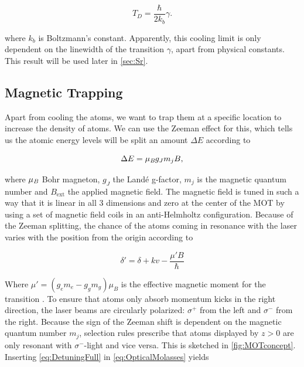 \begin{equation}\label{eq:DopplerTemperature}
	T_D = \frac{\hbar}{2k_b} \gamma.
\end{equation}

where $k_b$ is Boltzmann's constant. Apparently, this cooling limit is only dependent on the linewidth of the transition $\gamma$, apart from physical constants. This result will be used later in \cref{sec:Sr}.

\subsection{Magnetic Trapping}

Apart from cooling the atoms, we want to trap them at a specific location to increase the density of atoms. 
We can use the Zeeman effect for this, which tells us the atomic energy levels will be split an amount $\Delta E$ according to \cite{Griffiths2004}

\begin{equation}\label{eq:Zeeman}
	\Delta E = \mu_{\emph{B}} g_J m_j B,
\end{equation}

where $\mu_{\emph{B}}$ Bohr magneton, $g_J$ the Landé g-factor, $m_j$ is the magnetic quantum number and $B_{\text{ext}}$ the applied magnetic field. 
The magnetic field is tuned in such a way that it is linear in all 3 dimensions and zero at the center of the \ac{MOT} by using a set of magnetic field coils in an anti-Helmholtz configuration. 
Because of the Zeeman splitting, the chance of the atoms coming in resonance with the laser varies with the position from the origin according to \cite{Kowalski2010}

\begin{equation}\label{eq:DetuningFull}
	\delta' = \delta + k v - \frac{\mu'B}{\hbar}
\end{equation}

Where $\mu' = (g_e m_e-g_g m_g)\mu_B$ is the effective magnetic moment for the transition \cite{Kowalski2010}. 
To ensure that atoms only absorb momentum kicks in the right direction, the laser beams are circularly polarized: $\sigma^+$ from the left and $\sigma^-$ from the right. Because the sign of the Zeeman shift is dependent on the magnetic quantum number $m_j$, selection rules prescribe that atoms displayed by $z>0$ are only resonant with $\sigma^-$-light and vice versa.
This is sketched in \cref{fig:MOTconcept}. Inserting \cref{eq:DetuningFull} in \cref{eq:OpticalMolasses} yields

